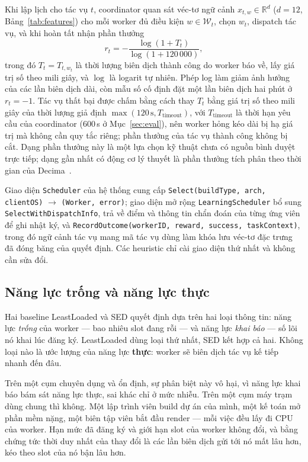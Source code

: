 \documentclass[final,5p,times,twocolumn]{elsarticle}
\begin{document}
Khi lập lịch cho tác vụ $t$, coordinator quan sát véc-tơ ngữ cảnh $x_{t,w}\in\mathbb{R}^d$ ($d=12$, Bảng~\ref{tab:features}) cho mỗi worker đủ điều kiện $w\in\mathcal{W}_t$, chọn $w_t$, dispatch tác vụ, và khi hoàn tất nhận phần thưởng
\begin{equation}
r_t=-\frac{\log(1+T_t)}{\log(1+120\,000)},
\end{equation}
trong đó $T_t=T_{t,w_t}$ là thời lượng biên dịch thành công do worker báo về, lấy giá trị số theo mili giây, và $\log$ là logarit tự nhiên. Phép log làm giảm ảnh hưởng của các lần biên dịch dài, còn mẫu số cố định đặt một lần biên dịch hai phút ở $r_t=-1$. Tác vụ thất bại được chấm bằng cách thay $T_t$ bằng giá trị số theo mili giây của thời lượng giả định $\max(120\,\text{s},T_{\text{timeout}})$, với $T_{\text{timeout}}$ là thời hạn yêu cầu của coordinator (600\,s ở Mục~\ref{sec:eval}), nên worker hỏng kéo dài bị hạ giá trị mà không cần quy tắc riêng; phần thưởng của tác vụ thành công không bị cắt. Dạng phần thưởng này là một lựa chọn kỹ thuật chưa có nguồn bình duyệt trực tiếp; dạng gần nhất có động cơ lý thuyết là phần thưởng tích phân theo thời gian của Decima~\cite{decima}.

Giao diện \texttt{Scheduler} của hệ thống cung cấp \texttt{Select(buildType, arch, clientOS)} $\to$ \texttt{(Worker, error)}; giao diện mở rộng \texttt{LearningScheduler} bổ sung \texttt{SelectWithDispatchInfo}, trả về điểm và thông tin chẩn đoán của từng ứng viên để ghi nhật ký, và \texttt{RecordOutcome(workerID, reward, success, taskContext)}, trong đó ngữ cảnh tác vụ mang mã tác vụ dùng làm khóa lưu véc-tơ đặc trưng đã đóng băng của quyết định. Các heuristic chỉ cài giao diện thứ nhất và không cần sửa đổi.

\subsection{Năng lực trống và năng lực thực}
\label{sec:capacity}

Hai baseline LeastLoaded và SED quyết định dựa trên hai loại thông tin: năng lực \emph{trống} của worker --- bao nhiêu slot đang rỗi --- và năng lực \emph{khai báo} --- số lõi nó khai lúc đăng ký. LeastLoaded dùng loại thứ nhất, SED kết hợp cả hai. Không loại nào là ước lượng của năng lực \textbf{thực}: worker sẽ biên dịch tác vụ kế tiếp nhanh đến đâu.

Trên một cụm chuyên dụng và ổn định, sự phân biệt này vô hại, vì năng lực khai báo bám sát năng lực thực, sai khác chỉ ở mức nhiễu. Trên một cụm máy trạm dùng chung thì không. Một lập trình viên build dự án của mình, một kế toán mở phần mềm nặng, một biên tập viên bắt đầu render --- mỗi việc đều lấy đi CPU của worker. Hạn mức đã đăng ký và giới hạn slot của worker không đổi, và bằng chứng tức thời duy nhất của thay đổi là các lần biên dịch gửi tới nó mất lâu hơn, kéo theo slot của nó bận lâu hơn.
\end{document}
